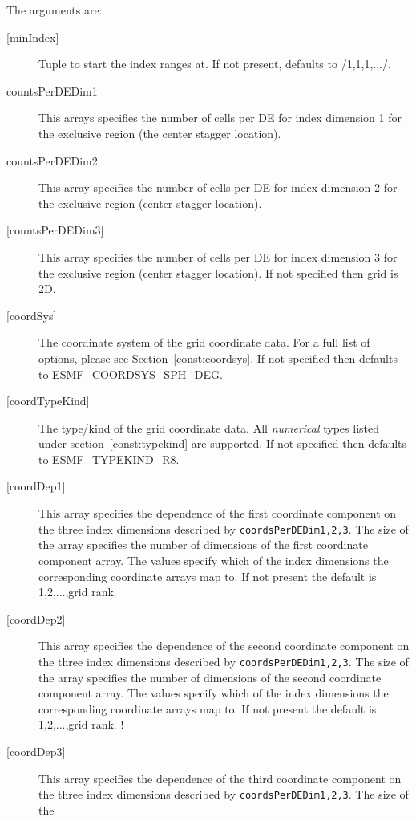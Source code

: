    The arguments are:
   \begin{description}
   \item[{[minIndex]}]
        Tuple to start the index ranges at. If not present, defaults
        to /1,1,1,.../.
   \item[countsPerDEDim1]
       This arrays specifies the number of cells per DE for index dimension 1
       for the exclusive region (the center stagger location).
   \item[countsPerDEDim2]
       This array specifies the number of cells per DE for index dimension 2
       for the exclusive region (center stagger location).
   \item[{[countsPerDEDim3]}]
       This array specifies the number of cells per DE for index dimension 3
       for the exclusive region (center stagger location).
       If not specified  then grid is 2D.
   \item[{[coordSys]}]
       The coordinate system of the grid coordinate data.
       For a full list of options, please see Section~\ref{const:coordsys}.
       If not specified then defaults to ESMF\_COORDSYS\_SPH\_DEG.
   \item[{[coordTypeKind]}]
       The type/kind of the grid coordinate data. All {\em numerical} types
       listed under section~\ref{const:typekind} are supported.
       If not specified then defaults to ESMF\_TYPEKIND\_R8.
   \item[{[coordDep1]}]
       This array specifies the dependence of the first
       coordinate component on the three index dimensions
       described by {\tt coordsPerDEDim1,2,3}. The size of the
       array specifies the number of dimensions of the first
       coordinate component array. The values specify which
       of the index dimensions the corresponding coordinate
       arrays map to. If not present the default is 1,2,...,grid rank.
   \item[{[coordDep2]}]
       This array specifies the dependence of the second
       coordinate component on the three index dimensions
       described by {\tt coordsPerDEDim1,2,3}. The size of the
       array specifies the number of dimensions of the second
       coordinate component array. The values specify which
       of the index dimensions the corresponding coordinate
       arrays map to. If not present the default is 1,2,...,grid rank.
  ! \item[{[coordDep3]}]
       This array specifies the dependence of the third
       coordinate component on the three index dimensions
       described by {\tt coordsPerDEDim1,2,3}. The size of the

\end{description}
